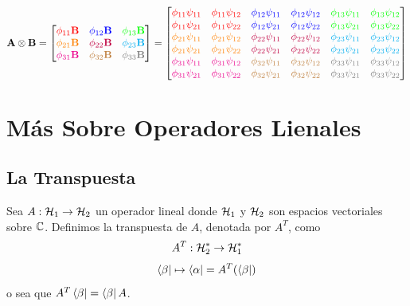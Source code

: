     $$ \mathbf{A} \otimes \mathbf{B} =
        \begin{bmatrix}
        \color{red}\phi_{11} \mathbf{B} & \color{blue}\phi_{12} \mathbf{B} & \color{green}\phi_{13} \mathbf{B} \\
        \color{orange}\phi_{21} \mathbf{B} & \color{purple}\phi_{22} \mathbf{B} & \color{cyan}\phi_{23} \mathbf{B} \\
        \color{magenta}\phi_{31} \mathbf{B} & \color{brown}\phi_{32} \mathbf{B} & \color{gray}\phi_{33} \mathbf{B}
        \end{bmatrix} =
        \begin{bmatrix}
        \color{red}\phi_{11}\psi_{11} & \color{red}\phi_{11}\psi_{12} & \color{blue}\phi_{12}\psi_{11} & \color{blue}\phi_{12}\psi_{12} & \color{green}\phi_{13}\psi_{11} & \color{green}\phi_{13}\psi_{12} \\
        \color{red}\phi_{11}\psi_{21} & \color{red}\phi_{11}\psi_{22} & \color{blue}\phi_{12}\psi_{21} & \color{blue}\phi_{12}\psi_{22} & \color{green}\phi_{13}\psi_{21} & \color{green}\phi_{13}\psi_{22} \\
        \color{orange}\phi_{21}\psi_{11} & \color{orange}\phi_{21}\psi_{12} & \color{purple}\phi_{22}\psi_{11} & \color{purple}\phi_{22}\psi_{12} & \color{cyan}\phi_{23}\psi_{11} & \color{cyan}\phi_{23}\psi_{12} \\
        \color{orange}\phi_{21}\psi_{21} & \color{orange}\phi_{21}\psi_{22} & \color{purple}\phi_{22}\psi_{21} & \color{purple}\phi_{22}\psi_{22} & \color{cyan}\phi_{23}\psi_{21} & \color{cyan}\phi_{23}\psi_{22} \\
        \color{magenta}\phi_{31}\psi_{11} & \color{magenta}\phi_{31}\psi_{12} & \color{brown}\phi_{32}\psi_{11} & \color{brown}\phi_{32}\psi_{12} & \color{gray}\phi_{33}\psi_{11} & \color{gray}\phi_{33}\psi_{12} \\
        \color{magenta}\phi_{31}\psi_{21} & \color{magenta}\phi_{31}\psi_{22} & \color{brown}\phi_{32}\psi_{21} & \color{brown}\phi_{32}\psi_{22} & \color{gray}\phi_{33}\psi_{21} & \color{gray}\phi_{33}\psi_{22}
        \end{bmatrix} $$


\section{Más Sobre Operadores Lienales}

\subsection{La Transpuesta}
Sea $A:\mathcal{H} _1 \to \mathcal{H} _2$ un operador lineal  donde $\mathcal{H} _1$ y $\mathcal{H} _2$ son espacios vectoriales sobre $\mathbb{C}$. Definimos la transpuesta de $A$, denotada por $A^T$, como
	$$ A^T : \mathcal{H} _2 ^* \to \mathcal{H} _1 ^* $$
	$$ \bra{\beta} \mapsto \bra{\alpha} = A^T (\bra{\beta}) $$
o sea que $A^T \bra{\beta} = \bra{\beta} A$.



